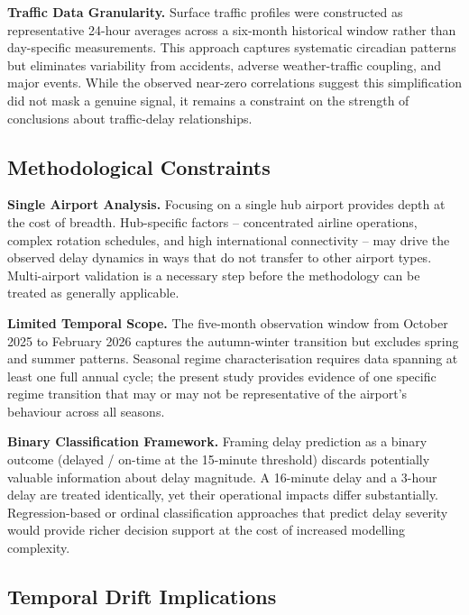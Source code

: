 \documentclass{report}
\begin{document}
\textbf{Traffic Data Granularity.}  Surface traffic profiles were constructed
as representative 24-hour averages across a six-month historical window rather
than day-specific measurements.  This approach captures systematic circadian
patterns but eliminates variability from accidents, adverse weather-traffic
coupling, and major events.  While the observed near-zero correlations suggest
this simplification did not mask a genuine signal, it remains a constraint on
the strength of conclusions about traffic-delay relationships.

\subsection{Methodological Constraints}

\textbf{Single Airport Analysis.}  Focusing on a single hub airport provides
depth at the cost of breadth.  Hub-specific factors -- concentrated airline
operations, complex rotation schedules, and high international connectivity --
may drive the observed delay dynamics in ways that do not transfer to other
airport types.  Multi-airport validation is a necessary step before the
methodology can be treated as generally applicable.

\textbf{Limited Temporal Scope.}  The five-month observation window from
October 2025 to February 2026 captures the autumn-winter transition but
excludes spring and summer patterns.  Seasonal regime characterisation
requires data spanning at least one full annual cycle; the present study
provides evidence of one specific regime transition that may or may not be
representative of the airport's behaviour across all seasons.

\textbf{Binary Classification Framework.}  Framing delay prediction as a
binary outcome (delayed / on-time at the 15-minute threshold) discards
potentially valuable information about delay magnitude.  A 16-minute delay
and a 3-hour delay are treated identically, yet their operational impacts
differ substantially.  Regression-based or ordinal classification approaches
that predict delay severity would provide richer decision support at the cost
of increased modelling complexity.

\subsection{Temporal Drift Implications}
\end{document}
